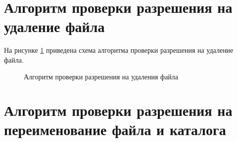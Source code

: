 \clearpage

\section{Алгоритм проверки разрешения на удаление файла}

На рисунке \ref{fig:unlink} приведена схема алгоритма проверки разрешения на удаление файла.

\begin{figure}[ph!]
	\caption{Алгоритм проверки разрешения на удаления файла}
	\label{fig:unlink}
\end{figure}

\clearpage

\section{Алгоритм проверки разрешения на переименование файла и каталога}

